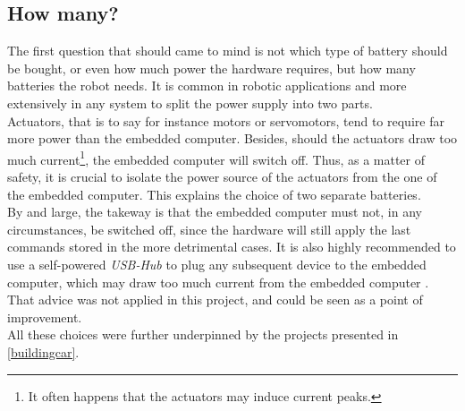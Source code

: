 		\subsection{How many?}
		The first question that should came to mind is not which type of battery
		should be bought, or even
		how much power the hardware requires, but how many batteries the robot 
		needs. It is common in robotic applications and more 
		extensively in any system to split the power supply into two parts.\cite{racecarj} 
		\\\indent Actuators, that is to say for instance motors
		or servomotors, tend to require far more power than the embedded computer. Besides, 
		should the actuators draw too much current\footnote{It often happens that the 
		actuators may induce current peaks.}, the embedded computer will switch off. Thus, 
		as a matter of safety, it is crucial to isolate the power source of the actuators
		from the one of the embedded computer. This explains the choice of two separate 
		batteries.
		\\\indent By and large, the takeway is that the embedded computer must not, 
		in any circumstances, be switched off, since the hardware will still 
		apply the last commands stored in the more detrimental cases. It is 
		also highly recommended to use a self-powered \textit{USB-Hub}
		to plug any subsequent device to the embedded computer, which 
		may draw too much current from the embedded computer \cite{racecarj}.
		That advice was not applied in this project, and could be
		seen as a point of improvement.
		\\\indent All these choices were further underpinned by 
		the projects presented in \vref{buildingcar}.
		
